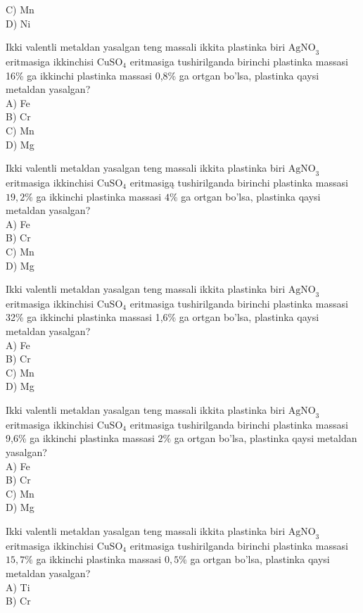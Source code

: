 C) Mn\\
D) Ni
  \item Ikki valentli metaldan yasalgan teng massali ikkita plastinka biri $\mathrm{AgNO}_{3}$ eritmasiga ikkinchisi $\mathrm{CuSO}_{4}$ eritmasiga tushirilganda birinchi plastinka massasi 16\% ga ikkinchi plastinka massasi 0,8\% ga ortgan bo'lsa, plastinka qaysi metaldan yasalgan?\\
A) Fe\\
B) Cr\\
C) Mn\\
D) Mg
  \item Ikki valentli metaldan yasalgan teng massali ikkita plastinka biri $\mathrm{AgNO}_{3}$ eritmasiga ikkinchisi $\mathrm{CuSO}_{4}$ eritmasigą tushirilganda birinchi plastinka massasi $19,2 \%$ ga ikkinchi plastinka massasi $4 \%$ ga ortgan bo'lsa, plastinka qaysi metaldan yasalgan?\\
A) Fe\\
B) Cr\\
C) Mn\\
D) Mg
  \item Ikki valentli metaldan yasalgan teng massali ikkita plastinka biri $\mathrm{AgNO}_{3}$ eritmasiga ikkinchisi $\mathrm{CuSO}_{4}$ eritmasiga tushirilganda birinchi plastinka massasi 32\% ga ikkinchi plastinka massasi 1,6\% ga ortgan bo'lsa, plastinka qaysi metaldan yasalgan?\\
A) Fe\\
B) Cr\\
C) Mn\\
D) Mg
  \item Ikki valentli metaldan yasalgan teng massali ikkita plastinka biri $\mathrm{AgNO}_{3}$ eritmasiga ikkinchisi $\mathrm{CuSO}_{4}$ eritmasiga tushirilganda birinchi plastinka massasi 9,6\% ga ikkinchi plastinka massasi $2 \%$ ga ortgan bo'lsa, plastinka qaysi metaldan yasalgan?\\
A) Fe\\
B) Cr\\
C) Mn\\
D) Mg
  \item Ikki valentli metaldan yasalgan teng massali ikkita plastinka biri $\mathrm{AgNO}_{3}$\\
eritmasiga ikkinchisi $\mathrm{CuSO}_{4}$ eritmasiga tushirilganda birinchi plastinka massasi $15,7 \%$ ga ikkinchi plastinka massasi $0,5 \%$ ga ortgan bo'lsa, plastinka qaysi metaldan yasalgan?\\
A) Ti\\
B) Cr\\
